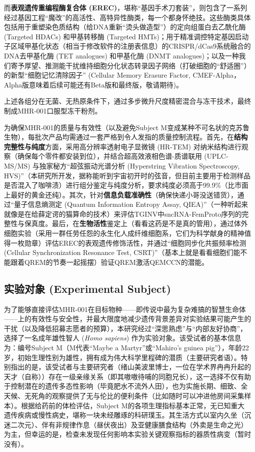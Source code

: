 而\textbf{表观遗传重编程酶复合体 (EREC)}，堪称“基因手术刀套装”，则包含了一系列经过基因工程“魔改”的高活性、高特异性酶类，每一个都身怀绝技。这些酶类具体包括用于重塑染色质结构（给DNA重新“烫头做造型”）的定向组蛋白去乙酰化酶 (Targeted HDACs) 和甲基转移酶 (Targeted HMTs)；用于精准调控特定基因启动子区域甲基化状态（相当于修改软件的注册表信息）的CRISPR/dCas9系统融合的DNA去甲基化酶 (TET analogues) 和甲基化酶 (DNMT analogues)；以及一种我们寄予厚望、推测能干扰维持细胞分化状态转录因子网络（打破细胞的“舒适圈”）的新型“细胞记忆清除因子” (Cellular Memory Erasure Factor, CMEF-Alpha，Alpha版意味着后续可能还有Beta版和最终版，敬请期待)。

上述各组分在无菌、无热原条件下，通过多步微升尺度精密混合与冻干技术，最终制成MHR-001口服型冻干粉剂。

为确保MHR-001的质量与有效性（以及避免Subject M变成某种不可名状的克苏鲁生物），每批次产品均需通过一套严格到令人发指的质量控制流程。首先，在\textbf{结构完整性与纯度}方面，采用高分辨率透射电子显微镜 (HR-TEM) 对纳米结构进行观察（确保每个零件都安装到位），并结合超高效液相色谱-质谱联用 (UPLC-MS/MS) 与独家秘方“超弦振动光谱分析 (Hyperstring Vibration Spectroscopy, HVS)”（本研究所开发，据称能听到宇宙初开时的弦音，但目前主要用于检测样品是否混入了咖啡渍）进行组分鉴定与纯度分析，要求纯度必须高于99.9\%（比市面上最好的黄金还纯）。其次，针对\textbf{信息负载准确性}（确保快递小哥没送错货），通过“量子信息熵测定 (Quantum Information Entropy Assay, QIEA)”（一种听起来就像是在给薛定谔的猫算命的技术）来评估TGINV中sncRNA-FemProto序列的完整性与保真度。最后，在\textbf{生物活性}鉴定上（看看这药是不是真的管用），通过体外细胞实验（采用一群任劳任怨的永生化人成纤维细胞系，它们为科学献身的精神值得一枚勋章）评估EREC的表观遗传修饰活性，并通过“细胞同步化共振频率检测 (Cellular Synchronization Resonance Test, CSRT)”（基本上就是看看细胞们能不能跟着QREM的节奏一起摇摆）验证QREM激活QEMCCN的潜能。

\subsection{实验对象 (Experimental Subject)}

为了能够直接评估MHR-001在目标物种——即传说中最为复杂难搞的智慧生命体——上的有效性与安全性，并最大限度地减少遗传背景差异对实验结果可能产生的干扰（以及降低招募志愿者的预算），本研究经过“深思熟虑”与“内部友好协商”，选择了一名成年雄性智人 (\textit{Homo sapiens}) 作为实验对象。该受试者的基本信息为：编号Subject M（M代表“Maybe a Martyr”或“Mahiro's guinea pig”），年龄22岁，初始生理性别为雄性，拥有成为伟大科学里程碑的潜质（主要研究者语）。特别指出的是，该受试者与主要研究者（绪山美波里博士，一位在学术界冉冉升起的天才（自称））存在一级亲缘关系（即其嗷嗷待哺的同胞兄长），这一选择不仅有助于控制潜在的遗传多态性影响（毕竟肥水不流外人田），也为实施长期、细致、全天候、无死角的观察提供了无与伦比的便利条件（比如随时可以冲进他房间采集样本）。根据给药前的体检评估，Subject M的各项生理指标基本正常，无已知重大遗传疾病或慢性病史，堪称一块未经雕琢的科研璞玉。其生活方式以室内久坐（沉迷二次元）、伴有非规律作息（昼伏夜出）及亚健康膳食结构（外卖是生命之光）为主，但幸运的是，检查未发现任何影响本实验关键观察指标的器质性病变（暂时没有）。


